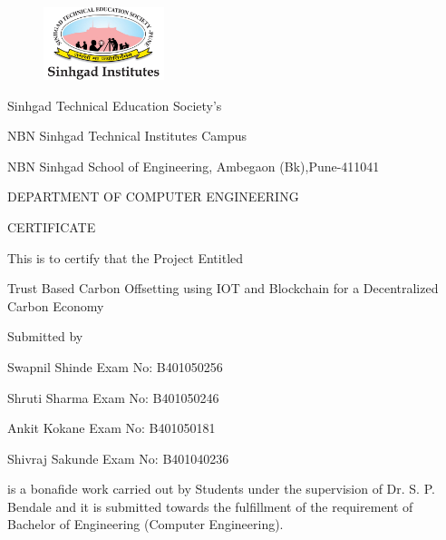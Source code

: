 \documentclass[oneside,a4paper,12pt]{book}
\begin{document}
\newpage

\begin{figure}[ht]
\centering
\includegraphics[width=100pt]{Logo-1606151851.jpg}
\end{figure}

{
\bfseries \fontsize{11}{11} \selectfont\centerline
{Sinhgad Technical Education Society's }
\bfseries \fontsize{14}{12} \selectfont 
\centerline{NBN Sinhgad Technical Institutes Campus }
\centerline{NBN Sinhgad School of Engineering, Ambegaon (Bk),Pune-411041 }

\centerline{DEPARTMENT OF COMPUTER ENGINEERING}
\vspace*{1.5\baselineskip}} 

{\bfseries \fontsize{16}{12} \selectfont \centerline{CERTIFICATE} 
\vspace*{1\baselineskip}} 

\centerline{This is to certify that the Project Entitled}
\vspace*{.5\baselineskip} 

{\bfseries \fontsize{12}{12} \selectfont \centerline{ Trust Based Carbon Offsetting using IOT and Blockchain for a Decentralized Carbon Economy}
\vspace*{0.5\baselineskip}}

\centerline{Submitted by}
\vspace*{0.5\baselineskip} 
\centerline{Swapnil Shinde  \hspace{28 mm} Exam No: B401050256 } 
\centerline{Shruti Sharma \hspace{21 mm} Exam No: B401050246 }
\centerline{Ankit Kokane \hspace{24 mm} Exam No: B401050181  } 
\centerline{Shivraj Sakunde \hspace{24 mm} Exam No: B401040236  } 

is a bonafide work carried out by Students under the supervision of Dr. S. P. Bendale and it
is submitted towards the  fulfillment of the requirement of Bachelor of Engineering (Computer Engineering).\\
 
\end{document}
